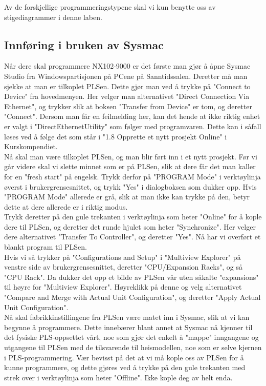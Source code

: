\begin{alphasection}
Av de forskjellige programmeringstypene skal vi kun benytte oss av stigediagrammer i denne laben.

\subsection{Innføring i bruken av Sysmac}
Når dere skal programmere NX102-9000 er det første man gjør å åpne Sysmac Studio fra Windowspartisjonen på PCene på Sanntidssalen. Deretter må man sjekke at man er tilkoplet PLSen. Dette gjør man ved å trykke på "Connect to Device" fra hovedmenyen. Her velger man alternativet "Direct Connection Via Ethernet", og trykker slik at boksen "Transfer from Device" er tom, og deretter "Connect". Dersom man får en feilmelding her, kan det hende at ikke riktig enhet er valgt i "DirectEthernetUtility" som følger med programvaren. Dette kan i såfall løses ved å følge det som står i "1.8 Opprette et nytt prosjekt Online" i Kurskompendiet.\\

Nå skal man være tilkoplet PLSen, og man blir ført inn i et nytt prosjekt. Før vi går videre skal vi slette minnet som er på PLSen, slik at dere får det man kaller for en "fresh start" på engelsk. Trykk derfor på "PROGRAM Mode" i verktøylinja øverst i brukergrensesnittet, og trykk "Yes" i dialogboksen som dukker opp. Hvis "PROGRAM Mode" allerede er grå, slik at man ikke kan trykke på den, betyr dette at dere allerede er i riktig modus.\\

Trykk deretter på den gule trekanten i verktøylinja som heter "Online" for å kople dere til PLSen, og deretter det runde hjulet som heter "Synchronize". Her velger dere alternativet "Transfer To Controller", og deretter "Yes". Nå har vi overført et blankt program til PLSen.\\

Hvis vi så trykker på "Configurations and Setup" i "Multiview Explorer" på venstre side av brukergrensesnittet, deretter "CPU/Expansion Racks", og så "CPU Rack". Da dukker det opp et bilde av PLSen vår uten såkalte "expansions" til høyre for "Multiview Explorer". Høyreklikk på denne og velg alternativet "Compare and Merge with Actual Unit Configuration", og deretter "Apply Actual Unit Configuration".\\

Nå skal fabrikkinstillingene fra PLSen være matet inn i Sysmac, slik at vi kan begynne å programmere. Dette innebærer blant annet at Sysmac nå kjenner til det fysiske PLS-oppsettet vårt, noe som gjør det enkelt å "mappe" inngangene og utgangene til PLSen med de tilsvarende til heismodellen, noe som er selve kjernen i PLS-programmering. Vær bevisst på det at vi må kople oss av PLSen for å kunne programmere, og dette gjøres ved å trykke på den gule trekanten med strek over i verktøylinja som heter "Offline". Ikke kople deg av helt enda.


\end{alphasection}
